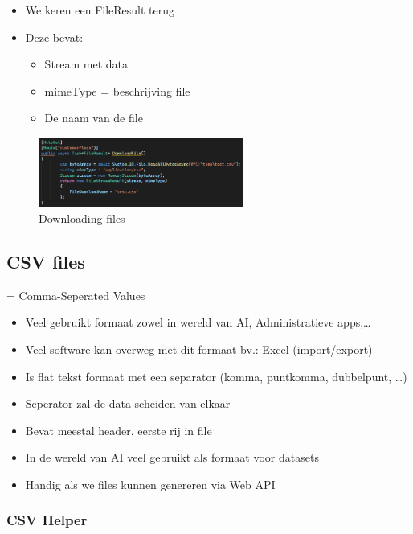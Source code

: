 \documentclass{article}
\begin{document}
\begin{itemize}
    \item We keren een FileResult terug
    \item Deze bevat:
    \begin{itemize}
        \item Stream met data
        \item mimeType = beschrijving file
        \item De naam van de file
    \end{itemize}
\end{itemize}

\begin{figure}[H]
    \centering
    \includegraphics[width=0.6\textwidth]{binary-files-download.png}
    \caption{Downloading files}
\end{figure}

\subsection{CSV files}

= Comma-Seperated Values

\begin{itemize}
    \item Veel gebruikt formaat zowel in wereld van AI, Administratieve apps,…
    \item Veel software kan overweg met dit formaat bv.: Excel (import/export)
    \item Is flat tekst formaat met een separator (komma, puntkomma, dubbelpunt, \dots)
    \item Seperator zal de data scheiden van elkaar
    \item Bevat meestal header, eerste rij in file
    \item In de wereld van AI veel gebruikt als formaat voor datasets
    \item Handig als we files kunnen genereren via Web API
\end{itemize}

\subsubsection{CSV Helper}
\end{document}
